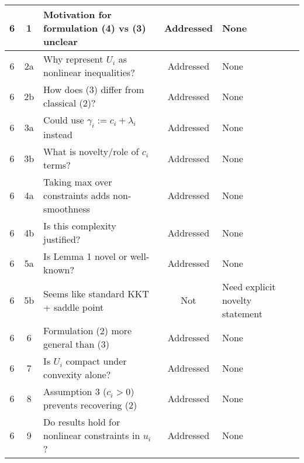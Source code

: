 \documentclass{article}
\begin{document}
\begin{longtable}{|c|c|p{5cm}|c|p{4cm}|}
6 & 1 & Motivation for formulation (4) vs (3) unclear & Addressed & None \\
\hline
6 & 2a & Why represent $U_i$ as nonlinear inequalities? & Addressed & None \\
\hline
6 & 2b & How does (3) differ from classical (2)? & Addressed & None \\
\hline
6 & 3a & Could use $\gamma_i := c_i + \lambda_i$ instead & Addressed & None \\
\hline
6 & 3b & What is novelty/role of $c_i$ terms? & Addressed & None \\
\hline
6 & 4a & Taking max over constraints adds non-smoothness & Addressed & None \\
\hline
6 & 4b & Is this complexity justified? & Addressed & None \\
\hline
6 & 5a & Is Lemma 1 novel or well-known? & Addressed & None \\
\hline
6 & 5b & Seems like standard KKT + saddle point & Not & Need explicit novelty statement \\
\hline
6 & 6 & Formulation (2) more general than (3) & Addressed & None \\
\hline
6 & 7 & Is $U_i$ compact under convexity alone? & Addressed & None \\
\hline
6 & 8 & Assumption 3 ($c_i>0$) prevents recovering (2) & Addressed & None \\
\hline
6 & 9 & Do results hold for nonlinear constraints in $u_i$? & Addressed & None \\
\hline


\end{longtable}
\end{document}
